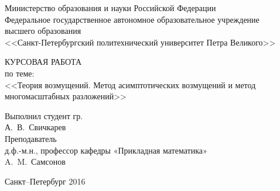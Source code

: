\begin{titlepage}

\begin{center}
    Министерство образования и науки Российской Федерации\\
    Федеральное государственное автономное образовательное учреждение\\
    высшего образования\\
    <<Санкт-Петербургский политехнический университет Петра Великого>>
\end{center}

\vfill

\begin{center}
    КУРСОВАЯ РАБОТА\\
    по теме:\\
    <<Теория возмущений. Метод асимптотических возмущений и метод многомасштабных разложений>>\\
\end{center}

\vfill

\begin{flushright}
    Выполнил студент гр. \\
    А.~В.~Свичкарев\\
    \bigskip
    Преподаватель\\
    д.ф.-м.н., профессор кафедры «Прикладная математика»\\
    A.~M.~Самсонов
\end{flushright}

\vfill

\begin{center}
    Санкт--Петербург  2016
\end{center}

\end{titlepage}

